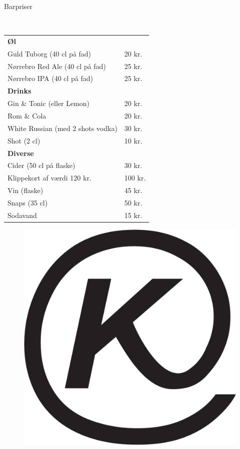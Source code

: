 \begin{flushleft}
\begin{huge}
Barpriser
\end{huge}
\\[.1cm]
\begin{table}[h!]
\begin{tabular}{p{} p{}}
\textbf{Øl} & \\
Guld Tuborg (40 cl på fad) & 20 kr.\\
Nørrebro Red Ale (40 cl på fad) & 25 kr.\\
Nørrebro IPA (40 cl på fad) & 25 kr.\\[2ex]
\textbf{Drinks} & \\
Gin \& Tonic (eller Lemon) & 20 kr.\\
Rom \& Cola & 20 kr.\\
White Russian \scriptsize{(med 2 shots vodka)} & 30 kr.\\
Shot (2 cl) & 10 kr.\\[2ex]
\textbf{Diverse} & \\
Cider (50 cl på flaske) & 30 kr. \\
Klippekort af værdi 120 kr. & 100 kr.\\
Vin (flaske) & 45 kr.\\
Snaps (35 cl) & 50 kr.\\
Sodavand & 15 kr.\\
\end{tabular}
\end{table}
\end{flushleft}
\begin{figure}[h!]
    \begin{center}
    \includegraphics[width=.45\linewidth]{../logo.pdf}
\end{center}
\end{figure}
